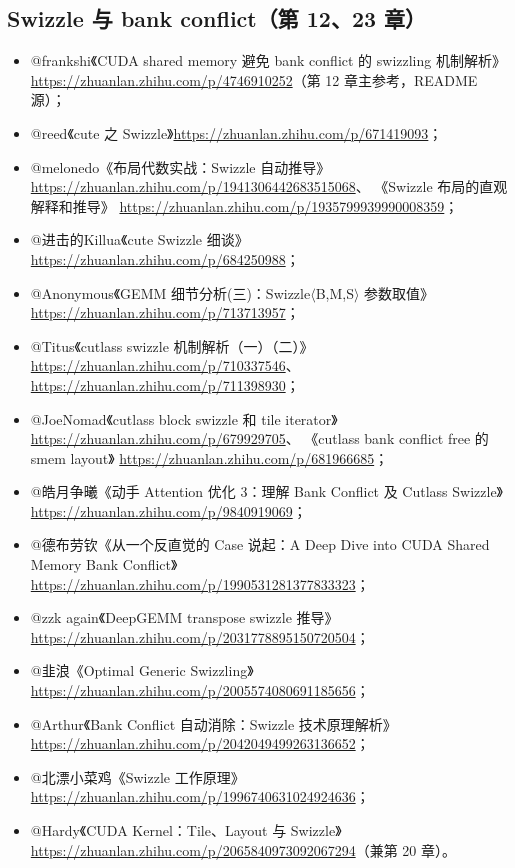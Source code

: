 \subsection{Swizzle 与 bank conflict（第 12、23 章）}

\begin{itemize}
  \item @frankshi《CUDA shared memory 避免 bank conflict 的 swizzling 机制解析》
        \url{https://zhuanlan.zhihu.com/p/4746910252}（第 12 章主参考，README 源）；
  \item @reed《cute 之 Swizzle》\url{https://zhuanlan.zhihu.com/p/671419093}；
  \item @melonedo《布局代数实战：Swizzle 自动推导》
        \url{https://zhuanlan.zhihu.com/p/1941306442683515068}、
        《Swizzle 布局的直观解释和推导》
        \url{https://zhuanlan.zhihu.com/p/1935799939990008359}；
  \item @进击的Killua《cute Swizzle 细谈》
        \url{https://zhuanlan.zhihu.com/p/684250988}；
  \item @Anonymous《GEMM 细节分析(三)：Swizzle$\langle$B,M,S$\rangle$ 参数取值》
        \url{https://zhuanlan.zhihu.com/p/713713957}；
  \item @Titus《cutlass swizzle 机制解析（一）（二）》
        \url{https://zhuanlan.zhihu.com/p/710337546}、
        \url{https://zhuanlan.zhihu.com/p/711398930}；
  \item @JoeNomad《cutlass block swizzle 和 tile iterator》
        \url{https://zhuanlan.zhihu.com/p/679929705}、
        《cutlass bank conflict free 的 smem layout》
        \url{https://zhuanlan.zhihu.com/p/681966685}；
  \item @皓月争曦《动手 Attention 优化 3：理解 Bank Conflict 及 Cutlass Swizzle》
        \url{https://zhuanlan.zhihu.com/p/9840919069}；
  \item @德布劳钦《从一个反直觉的 Case 说起：A Deep Dive into CUDA Shared
        Memory Bank Conflict》\url{https://zhuanlan.zhihu.com/p/1990531281377833323}；
  \item @zzk again《DeepGEMM transpose swizzle 推导》
        \url{https://zhuanlan.zhihu.com/p/2031778895150720504}；
  \item @韭浪《Optimal Generic Swizzling》
        \url{https://zhuanlan.zhihu.com/p/2005574080691185656}；
  \item @Arthur《Bank Conflict 自动消除：Swizzle 技术原理解析》
        \url{https://zhuanlan.zhihu.com/p/2042049499263136652}；
  \item @北漂小菜鸡《Swizzle 工作原理》
        \url{https://zhuanlan.zhihu.com/p/1996740631024924636}；
  \item @Hardy《CUDA Kernel：Tile、Layout 与 Swizzle》
        \url{https://zhuanlan.zhihu.com/p/2065840973092067294}（兼第 20 章）。
\end{itemize}

